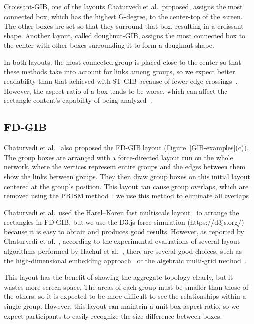 \documentclass[review]{vgtc}                 %
\begin{document}
Croissant-GIB, one of the layouts Chaturvedi et al.\ proposed, assigns the most connected box, which has the highest G-degree, to the center-top of the screen. The other boxes are set so that they surround that box, resulting in a croissant shape. Another layout, called doughnut-GIB, assigns the most connected box to the center with other boxes surrounding it to form a doughnut shape.

In both layouts, the most connected group is placed close to the center so that these methods take into account for links among groups, so we expect better readability than that achieved with ST-GIB because of fewer edge crossings~\cite{468391,purchase1997aesthetic,purchase1998performance,purchase2002empirical}.
However, the aspect ratio of a box tends to be worse, which can affect the rectangle content's capability of being analyzed~\cite{bruls2000squarified}.

\subsection{FD-GIB}
Chaturvedi et al.~\cite{chaturvedi2014group} also proposed the FD-GIB layout (Figure~\ref{GIB-examples}(c)).
The group boxes are arranged with a force-directed layout run on the whole network, where the vertices represent entire groups and the edges between them show the links between groups.
They then draw group boxes on this initial layout centered at the group's position.
This layout can cause group overlaps, which are removed using the PRISM method~\cite{gansner2008efficient}; we use this method to eliminate all overlaps.

Chaturvedi et al.\ used the Harel--Koren fast multiscale layout~\cite{harel2002graph} to arrange the rectangles in FD-GIB, but we use the D3.js force simulation (https://d3js.org/) because it is easy to obtain and produces good results.
However, as reported by Chaturvedi et al.~\cite{chaturvedi2014group}, according to the experimental evaluations of several layout algorithms performed by Hachul et al.~\cite{Hachul:2005:ECF:2102325.2102348,Hachul2007LargeGraphLA}, there are several good choices, such as the high-dimensional embedding approach~\cite{harel2002graph} or the algebraic multi-grid method~\cite{koren2003drawing}.

This layout has the benefit of showing the aggregate topology clearly, but it wastes more screen space.
The areas of each group must be smaller than those of the others, so it is expected to be more difficult to see the relationships within a single group. However, this layout can maintain a unit box aspect ratio, so we expect participants to easily recognize the size difference between boxes.
\end{document}
